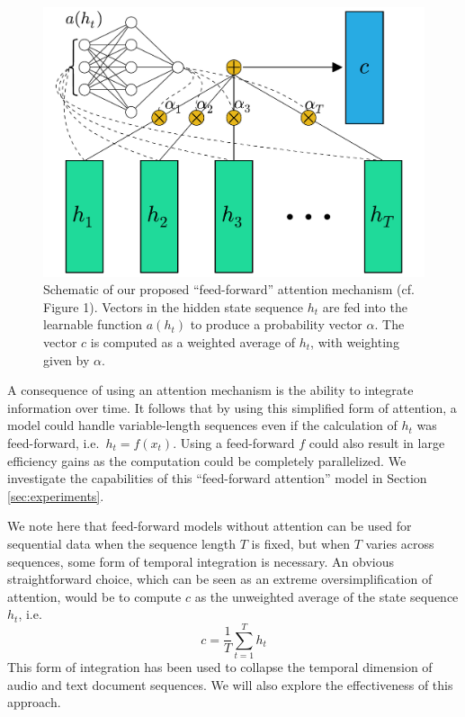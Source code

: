 \documentclass{article} %
\begin{document}
\begin{figure}
  \centering
  \includegraphics[width=.8\textwidth]{schematic.pdf}
  \caption{Schematic of our proposed ``feed-forward'' attention mechanism (cf.\ \citep{cho2015introduction} Figure 1).  Vectors in the hidden state sequence $h_t$ are fed into the learnable function $a(h_t)$ to produce a probability vector $\alpha$.  The vector $c$ is computed as a weighted average of $h_t$, with weighting given by $\alpha$.}
  \label{fig:schematic}
\end{figure}

A consequence of using an attention mechanism is the ability to integrate information over time.
It follows that by using this simplified form of attention, a model could handle variable-length sequences even if the calculation of $h_t$ was feed-forward, i.e.\ $h_t = f(x_t)$.
Using a feed-forward $f$ could also result in large efficiency gains as the computation could be completely parallelized.
We investigate the capabilities of this ``feed-forward attention'' model in Section \ref{sec:experiments}.

We note here that feed-forward models without attention can be used for sequential data when the sequence length $T$ is fixed, but when $T$ varies across sequences, some form of temporal integration is necessary.
An obvious straightforward choice, which can be seen as an extreme oversimplification of attention, would be to compute $c$ as the unweighted average of the state sequence $h_t$, i.e.
\begin{equation}
\label{eq:unweighted}
c = \frac{1}{T}\sum_{t = 1}^T h_t
\end{equation}
This form of integration has been used to collapse the temporal dimension of audio \citep{dieleman2014recommending} and text document \citep{lei2015molding} sequences.
We will also explore the effectiveness of this approach.
\end{document}
